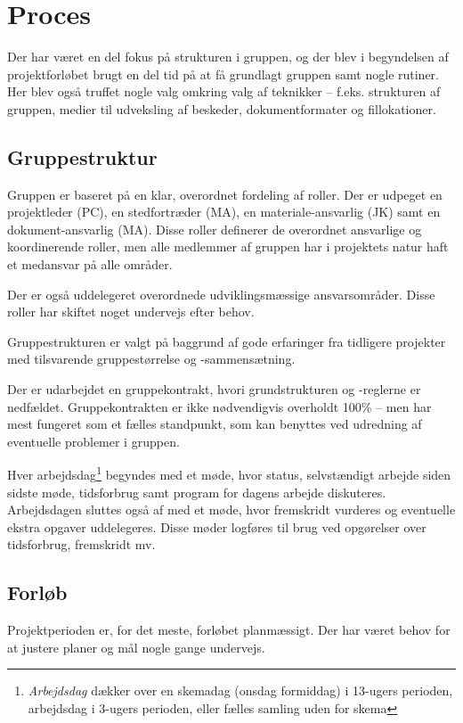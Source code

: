 \chapter{Proces}\label{cha:process}
Der har været en del fokus på strukturen i gruppen, og der blev i begyndelsen af projektforløbet brugt en del tid på at få grundlagt gruppen samt nogle rutiner. Her blev også truffet nogle valg omkring valg af teknikker -- f.eks. strukturen af gruppen, medier til udveksling af beskeder, dokumentformater og fillokationer.

\section{Gruppestruktur}
Gruppen er baseret på en klar, overordnet fordeling af roller. Der er udpeget en projektleder (PC), en stedfortræder (MA), en materiale-ansvarlig (JK) samt en dokument-ansvarlig (MA). Disse roller definerer de overordnet ansvarlige og koordinerende roller, men alle medlemmer af gruppen har i projektets natur haft et medansvar på alle områder.

Der er også uddelegeret overordnede udviklingsmæssige ansvarsområder. Disse roller har skiftet noget undervejs efter behov.

Gruppestrukturen er valgt på baggrund af gode erfaringer fra tidligere projekter med tilsvarende gruppestørrelse og -sammensætning.

Der er udarbejdet en gruppekontrakt, hvori grundstrukturen og -reglerne er nedfældet. Gruppekontrakten er ikke nødvendigvis overholdt 100\% -- men har mest fungeret som et fælles standpunkt, som kan benyttes ved udredning af eventuelle problemer i gruppen.

Hver arbejdsdag\footnote{\textit{Arbejdsdag} dækker over en skemadag (onsdag formiddag) i 13-ugers perioden, arbejdsdag i 3-ugers perioden, eller fælles samling uden for skema} begyndes med et møde, hvor status, selvstændigt arbejde siden sidste møde, tidsforbrug samt program for dagens arbejde diskuteres. Arbejdsdagen sluttes også af med et møde, hvor fremskridt vurderes og eventuelle ekstra opgaver uddelegeres. Disse møder logføres til brug ved opgørelser over tidsforbrug, fremskridt mv.

\section{Forløb}
Projektperioden er, for det meste, forløbet planmæssigt. Der har været behov for at justere planer og mål nogle gange undervejs.

